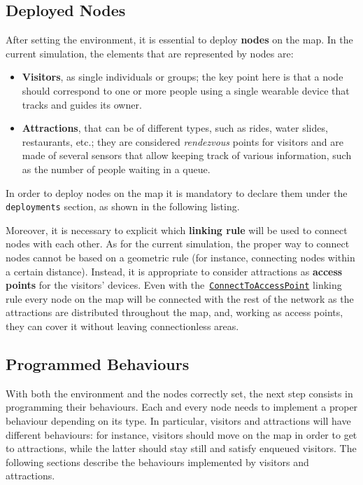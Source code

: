 \subsection{Deployed Nodes}\label{subsec:deployed-nodes}
After setting the environment, it is essential to deploy \textbf{nodes} on the map.
In the current simulation, the elements that are represented by nodes are:
\begin{itemize}
    \item \textbf{Visitors}, as single individuals or groups;
    the key point here is that a node should correspond to one or more people using a single wearable device that tracks and guides its owner.
    \item \textbf{Attractions}, that can be of different types, such as rides, water slides, restaurants, etc.; they are considered \textit{rendezvous} points for visitors and are made of several sensors that allow keeping track of various information, such as the number of people waiting in a queue.
\end{itemize}

\noindent
In order to deploy nodes on the map it is mandatory to declare them under the \texttt{deployments} section, as shown in the following listing.



\noindent
Moreover, it is necessary to explicit which \textbf{linking rule} will be used to connect nodes with each other.
As for the current simulation, the proper way to connect nodes cannot be based on a geometric rule (for instance, connecting nodes within a certain distance).
Instead, it is appropriate to consider attractions as \textbf{access points} for the visitors' devices.
Even with the~\href{https://alchemistsimulator.github.io/reference/kdoc/alchemist/it.unibo.alchemist.model.implementations.linkingrules/-connect-to-access-point/index.html}{\texttt{ConnectToAccessPoint}} linking rule every node on the map will be connected with the rest of the network as the attractions are distributed throughout the map, and, working as access points, they can cover it without leaving connectionless areas.



\subsection{Programmed Behaviours}
With both the environment and the nodes correctly set, the next step consists in programming their behaviours.
Each and every node needs to implement a proper behaviour depending on its type.
In particular, visitors and attractions will have different behaviours: for instance, visitors should move on the map in order to get to attractions, while the latter should stay still and satisfy enqueued visitors.
The following sections describe the behaviours implemented by visitors and attractions.

